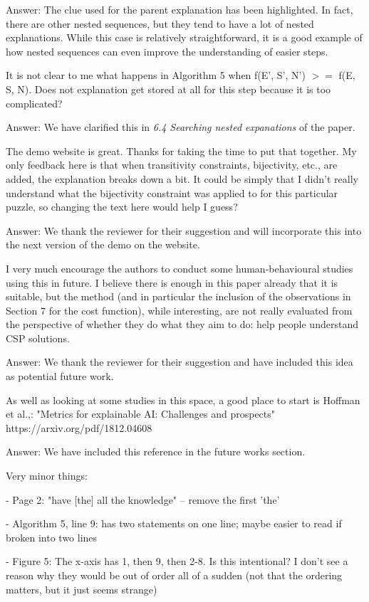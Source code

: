 \documentclass{article}
\newcommand\comment[1]{\marginpar{\tiny #1}}
\renewcommand\comment[1]{#1}
\newcommand{\emilio}[1]{{\comment{Answer: \color{red}#1}}}
\begin{document}
\emilio{The clue used for the parent explanation has been highlighted. In fact, there are other nested sequences, but they tend to have a lot of nested explanations. While this case is relatively straightforward, it is a good example of how nested sequences can even improve the understanding of easier steps.}

\begin{quoteit}
It is not clear to me what happens in Algorithm 5 when f(E', S', N') $>=$ f(E, S, N). Does not explanation get stored at all for this step because it is too complicated? 
\end{quoteit}

\emilio{We have clarified this in \emph{6.4 Searching nested expanations} of the paper.}

\begin{quoteit}
The demo website is great. Thanks for taking the time to put that together. My only feedback here is that when transitivity constraints, bijectivity, etc., are added, the explanation breaks down a bit. It could be simply that I didn't really  understand what the bijectivity constraint was applied to for this particular puzzle, so changing the text here would help I guess?
\end{quoteit}

\emilio{We thank the reviewer for their suggestion and will incorporate this into the next version of the demo on the website.}

\begin{quoteit}
I very much encourage the authors to conduct some human-behavioural studies using this in future. I believe there is enough in this paper already that it is suitable, but the method (and in particular the inclusion of the observations in Section 7 for the cost function), while interesting, are not really evaluated from the perspective of whether they do what they aim to do: help people understand CSP solutions. 
\end{quoteit}

\emilio{We thank the reviewer for their suggestion and have included this idea as potential future work.}


\begin{quoteit}
As well as looking at some studies in this space, a good place to start is Hoffman et al.,: "Metrics for explainable AI: Challenges and prospects" https://arxiv.org/pdf/1812.04608 
\end{quoteit}

\emilio{We have included this reference in the future works section.}

Very minor things:

- Page 2: "have [the] all the knowledge" -- remove the first 'the'

- Algorithm 5, line 9: has two statements on one line; maybe easier to
read if broken into two lines

- Figure 5: The x-axis has 1, then 9, then 2-8. Is this intentional? I
don't see a reason why they would be out of order all of a sudden (not
that the ordering matters, but it just seems strange)
\end{document}
